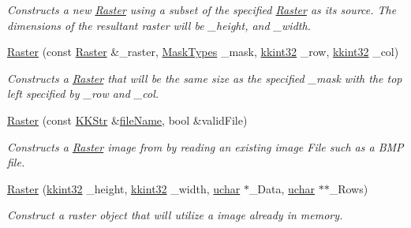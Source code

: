 \begin{DoxyCompactItemize}
\begin{DoxyCompactList}\small\item\em Constructs a new \hyperlink{class_k_k_b_1_1_raster}{Raster} using a subset of the specified \hyperlink{class_k_k_b_1_1_raster}{Raster} as its source. The dimensions of the resultant raster will be \textquotesingle{}\+\_\+height\textquotesingle{}, and \textquotesingle{}\+\_\+width\textquotesingle{}. \end{DoxyCompactList}\item 
\hyperlink{class_k_k_b_1_1_raster_a5b465ed19680790d6ce617cd6dfd429b}{Raster} (const \hyperlink{class_k_k_b_1_1_raster}{Raster} \&\+\_\+raster, \hyperlink{class_k_k_b_1_1_morph_op_a9eaa0383bf9e046da208af397e7e35eb}{Mask\+Types} \+\_\+mask, \hyperlink{namespace_k_k_b_a8fa4952cc84fda1de4bec1fbdd8d5b1b}{kkint32} \+\_\+row, \hyperlink{namespace_k_k_b_a8fa4952cc84fda1de4bec1fbdd8d5b1b}{kkint32} \+\_\+col)
\begin{DoxyCompactList}\small\item\em Constructs a \hyperlink{class_k_k_b_1_1_raster}{Raster} that will be the same size as the specified \textquotesingle{}\+\_\+mask\textquotesingle{} with the top left specified by \textquotesingle{}\+\_\+row\textquotesingle{} and \textquotesingle{}\+\_\+col\textquotesingle{}. \end{DoxyCompactList}\item 
\hyperlink{class_k_k_b_1_1_raster_aa6ec004fc43f9e9ff35ef9fe431cb34a}{Raster} (const \hyperlink{class_k_k_b_1_1_k_k_str}{K\+K\+Str} \&\hyperlink{class_k_k_b_1_1_raster_a742e1da027493443f2dda570a89fe2e9}{file\+Name}, bool \&valid\+File)
\begin{DoxyCompactList}\small\item\em Constructs a \hyperlink{class_k_k_b_1_1_raster}{Raster} image from by reading an existing image File such as a B\+MP file. \end{DoxyCompactList}\item 
\hyperlink{class_k_k_b_1_1_raster_a59efd48491562c981fc5667abfadf153}{Raster} (\hyperlink{namespace_k_k_b_a8fa4952cc84fda1de4bec1fbdd8d5b1b}{kkint32} \+\_\+height, \hyperlink{namespace_k_k_b_a8fa4952cc84fda1de4bec1fbdd8d5b1b}{kkint32} \+\_\+width, \hyperlink{namespace_k_k_b_ace9969169bf514f9ee6185186949cdf7}{uchar} $\ast$\+\_\+\+Data, \hyperlink{namespace_k_k_b_ace9969169bf514f9ee6185186949cdf7}{uchar} $\ast$$\ast$\+\_\+\+Rows)
\begin{DoxyCompactList}\small\item\em Construct a raster object that will utilize a image already in memory. \end{DoxyCompactList}\item 
$$
\end{DoxyCompactItemize}

